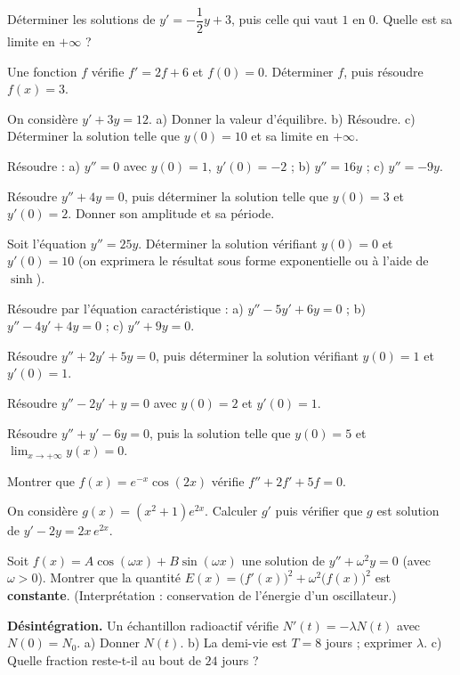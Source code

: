 \exo{} Déterminer les solutions de $y'=-\dfrac12 y+3$, puis celle qui
vaut $1$ en $0$. Quelle est sa limite en $+\infty$ ?

\exo{} Une fonction $f$ vérifie $f'=2f+6$ et $f(0)=0$. Déterminer $f$,
puis résoudre $f(x)=3$.

\exo{} On considère $y'+3y=12$. a) Donner la valeur d'équilibre.
b) Résoudre. c) Déterminer la solution telle que $y(0)=10$ et sa limite en
$+\infty$.


\exo{} Résoudre : a) $y''=0$ avec $y(0)=1,\ y'(0)=-2$ ; \quad
b) $y''=16y$ ; \quad c) $y''=-9y$.

\exo{} Résoudre $y''+4y=0$, puis déterminer la solution telle que
$y(0)=3$ et $y'(0)=2$. Donner son amplitude et sa période.

\exo{} Soit l'équation $y''=25y$. Déterminer la solution vérifiant
$y(0)=0$ et $y'(0)=10$ (on exprimera le résultat sous forme exponentielle ou à
l'aide de $\sinh$).


\exo{} Résoudre par l'équation caractéristique :
a) $y''-5y'+6y=0$ ; \quad b) $y''-4y'+4y=0$ ; \quad c) $y''+9y=0$.

\exo{} Résoudre $y''+2y'+5y=0$, puis déterminer la solution vérifiant
$y(0)=1$ et $y'(0)=1$.

\exo{} Résoudre $y''-2y'+y=0$ avec $y(0)=2$ et $y'(0)=1$.

\exo{} Résoudre $y''+y'-6y=0$, puis la solution telle que $y(0)=5$ et
$\displaystyle\lim_{x\to+\infty}y(x)=0$.


\exo{} Montrer que $f(x)=e^{-x}\cos(2x)$ vérifie $f''+2f'+5f=0$.

\exo{} On considère $g(x)=(x^2+1)e^{2x}$. Calculer $g'$ puis vérifier que
$g$ est solution de $y'-2y=2x\,e^{2x}$.

\exo{} Soit $f(x)=A\cos(\omega x)+B\sin(\omega x)$ une solution de
$y''+\omega^2 y=0$ (avec $\omega>0$). Montrer que la quantité
$E(x)=\big(f'(x)\big)^2+\omega^2\big(f(x)\big)^2$ est \textbf{constante}.
(Interprétation : conservation de l'énergie d'un oscillateur.)


\exo{} \textbf{Désintégration.} Un échantillon radioactif vérifie
$N'(t)=-\lambda N(t)$ avec $N(0)=N_0$. a) Donner $N(t)$. b) La demi-vie est
$T=8$ jours ; exprimer $\lambda$. c) Quelle fraction reste-t-il au bout de
$24$ jours ?

